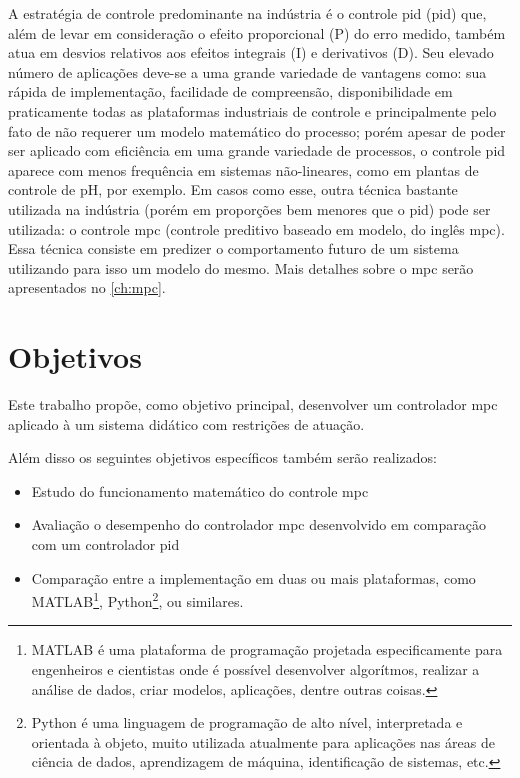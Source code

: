 A estratégia de controle predominante na indústria é o controle \acrshort{pid}
(\acrlong{pid}) que, além de levar em consideração o efeito proporcional (P) do erro
medido, também atua em desvios relativos aos efeitos integrais (I) e derivativos (D).
Seu elevado número de aplicações deve-se a uma grande variedade de vantagens como:
sua rápida de implementação, facilidade de compreensão, disponibilidade em praticamente
todas as plataformas industriais de controle e principalmente pelo fato de não requerer
um modelo matemático do processo; porém apesar de poder ser aplicado com eficiência em
uma grande variedade de processos, o controle \acrshort{pid} aparece com menos frequência
em sistemas não-lineares, como em plantas de controle de pH, por exemplo. Em casos como
esse, outra técnica bastante utilizada na indústria (porém em proporções bem menores
que o \acrshort{pid}) pode ser utilizada: o controle \acrshort{mpc} (controle preditivo
baseado em modelo, do inglês \acrlong{mpc}). Essa técnica consiste em predizer o
comportamento futuro de um sistema utilizando para isso um modelo do mesmo. Mais
detalhes sobre o \acrshort{mpc} serão apresentados no \cref{ch:mpc}.

\section{Objetivos}
\label{sec:objetivos}

Este trabalho propõe, como objetivo principal, desenvolver um controlador \acrshort{mpc}
aplicado à um sistema didático com restrições de atuação.

Além disso os seguintes objetivos específicos também serão realizados:
\begin{itemize}
    \item Estudo do funcionamento matemático do controle \acrshort{mpc}
    \item Avaliação o desempenho do controlador \acrshort{mpc} desenvolvido em
        comparação com um controlador \acrshort{pid}
    \item Comparação entre a implementação em duas ou mais plataformas,
        como MATLAB\textsuperscript{\tiny\textregistered}\footnote{
            MATLAB\textsuperscript{\tiny\textregistered} é uma plataforma                           %
            de programação projetada especificamente para engenheiros e cientistas                  %
            onde é possível desenvolver algorítmos, realizar a análise de dados,                    %
            criar modelos, aplicações, dentre outras coisas.},                                      %
        Python\footnote{
            Python é uma linguagem de programação de alto nível,                                    %
            interpretada e orientada à objeto, muito utilizada atualmente para                      %
            aplicações nas áreas de ciência de dados, aprendizagem de máquina,                      %
            identificação de sistemas, etc.},                                                       %
        ou similares.
\end{itemize}

